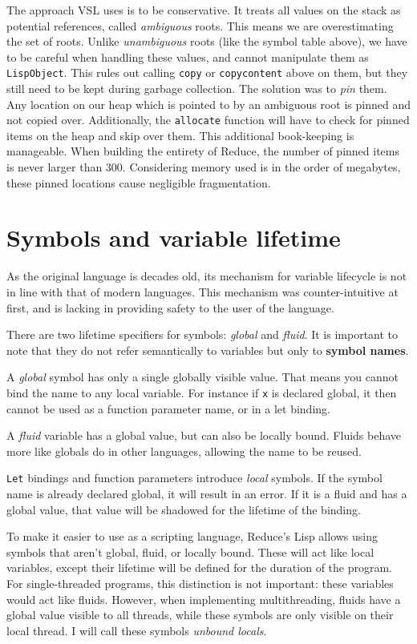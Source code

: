 The approach VSL uses is to be conservative. It treats all values on the stack as potential references, called \emph{ambiguous} roots.
This means we are overestimating the set of roots. Unlike \emph{unambiguous} roots (like the symbol table above), we
have to be careful when handling these values, and cannot manipulate them as \texttt{LispObject}. This rules out calling
\texttt{copy} or \texttt{copycontent} above on them, but they still need to be kept during garbage collection. The solution was
to \emph{pin} them. Any location on our heap which is pointed to by an ambiguous root is pinned and not copied over.
Additionally, the \texttt{allocate} function will have to check for pinned items on the heap and skip over them. This
additional book-keeping is manageable. When building the entirety of Reduce, the number of pinned items is never
larger than 300. Considering memory used is in the order of megabytes, these pinned locations cause negligible
fragmentation.

\section{Symbols and variable lifetime}
As the original language is decades old, its mechanism for variable lifecycle is not in line with that of modern languages.
This mechanism was counter-intuitive at first, and is lacking in providing safety to the user of the language.

There are two lifetime specifiers for symbols: \emph{global} and \emph{fluid}. It is important to note that they
do not refer semantically to variables but only to \textbf{symbol names}.

A \emph{global} symbol has only a single globally visible value. That means you cannot bind the name to any local
variable. For instance if \texttt{x} is declared global, it then cannot be used as a function parameter name, or in a
let binding.

A \emph{fluid} variable has a global value, but can also be locally bound. Fluids behave more like globals do
in other languages, allowing the name to be reused.

\texttt{Let} bindings and function parameters introduce \emph{local} symbols. If the symbol name is already declared global,
it will result in an error. If it is a fluid and has a global value, that value will be shadowed for the lifetime
of the binding.

To make it easier to use as a scripting language, Reduce's Lisp allows using symbols that aren't global, fluid,
or locally bound. These will act like local variables, except their lifetime will be defined for the duration of the
program. For single-threaded programs, this distinction is not important: these variables would act like fluids. However,
when implementing multithreading, fluids have a global value visible to all threads, while these symbols are only
visible on their local thread. I will call these symbols \emph{unbound locals}.

